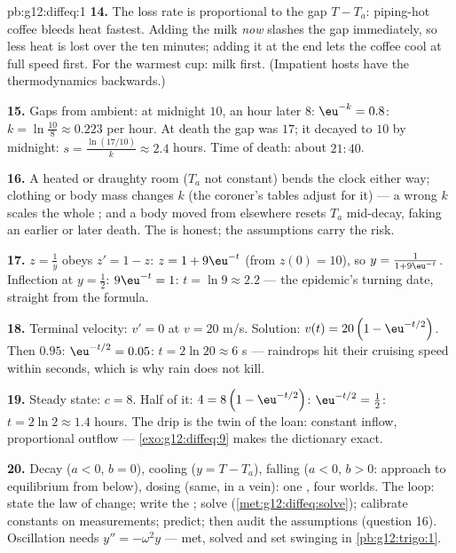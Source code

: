 \begin{solution}{pb:g12:diffeq:1}
\textbf{14.} The loss rate is proportional to the gap
$T - T_a$: piping-hot coffee bleeds heat fastest. Adding the
milk \emph{now} slashes the gap immediately, so less heat is
lost over the ten minutes; adding it at the end lets the
coffee cool at full speed first. For the warmest cup: milk
first. (Impatient hosts have the thermodynamics backwards.)

\textbf{15.} Gaps from ambient: at midnight $10$, an hour
later $8$: $\eu^{-k} = 0.8$:
$k = \ln\frac{10}{8} \approx 0.223$ per hour. At death the gap
was $17$; it decayed to $10$ by midnight:
$s = \frac{\ln(17/10)}{k} \approx 2.4$ hours. Time of death:
about $21{:}40$.

\textbf{16.} A heated or draughty room ($T_a$ not constant)
bends the clock either way; clothing or body mass changes $k$
(the coroner's tables adjust for it) --- a wrong $k$ scales
the whole ; and a body moved from elsewhere resets
$T_a$ mid-decay, faking an earlier or later death. The
 is honest; the assumptions carry the risk.

\textbf{17.} $z = \frac1y$ obeys $z' = 1 - z$:
$z = 1 + 9\eu^{-t}$ (from $z(0) = 10$), so
$y = \frac{1}{1 + 9\eu^{-t}}$. Inflection at $y = \frac12$:
$9\eu^{-t} = 1$: $t = \ln 9 \approx 2.2$ --- the epidemic's
turning date, straight from the formula.

\textbf{18.} Terminal velocity: $v' = 0$ at $v = 20$ m/s.
Solution: $v(t) = 20\left(1 - \eu^{-t/2}\right)$. Then
$0.95$: $\eu^{-t/2} = 0.05$: $t = 2\ln 20 \approx 6$ s ---
raindrops hit their cruising speed within seconds, which is
why rain does not kill.

\textbf{19.} Steady state: $c = 8$. Half of it:
$4 = 8\left(1 - \eu^{-t/2}\right)$: $\eu^{-t/2} = \frac12$:
$t = 2\ln 2 \approx 1.4$ hours. The drip is the 
twin of the loan: constant inflow, proportional outflow ---
\cref{exo:g12:diffeq:9} makes the dictionary exact.

\textbf{20.} Decay ($a < 0$, $b = 0$), cooling ($y = T - T_a$),
falling ($a < 0$, $b > 0$: approach to equilibrium from
below), dosing (same, in a vein): one , four worlds.
The loop: state the law of change; write the ; solve
(\cref{met:g12:diffeq:solve}); calibrate constants on
measurements; predict; then audit the assumptions (question
16). Oscillation needs $y'' = -\omega^2 y$ --- met, solved and
set swinging in \cref{pb:g12:trigo:1}.
\end{solution}

